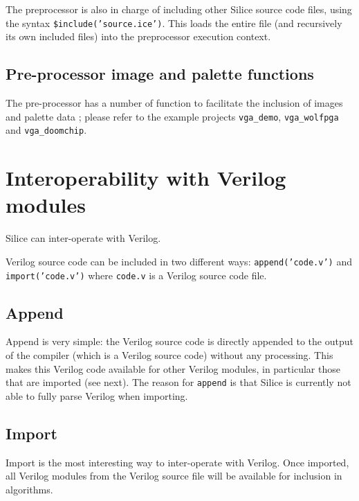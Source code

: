 \documentclass[a4]{article}
\newcommand\verilog{Verilog}
\newcommand\silice{Silice}
\begin{document}
The preprocessor is also in charge of including other Silice source code files,
using the syntax \texttt{\$include('source.ice')}. This loads the entire file
(and recursively its own included files) into the preprocessor execution context.


\subsection{Pre-processor image and palette functions}

The pre-processor has a number of function to facilitate the inclusion of images
and palette data ; please refer to the example projects \texttt{vga\_demo}, \texttt{vga\_wolfpga} and \texttt{vga\_doomchip}.


\section{Interoperability with \verilog{} modules}

\silice{} can inter-operate with \verilog{}.

\verilog{} source code can be included in two different ways: \texttt{append('code.v')} and \texttt{import('code.v')} where \texttt{code.v} is a \verilog{} source code file.

\subsection{Append}

Append is very simple: the \verilog{} source code is directly appended to the output of the compiler (which is a \verilog{} source code) without any processing. This makes this \verilog{} code available for other \verilog{} modules, in particular those that are imported (see next). The reason for \texttt{append} is that \silice{} is currently not able to fully parse \verilog{} when importing. 

\subsection{Import}

Import is the most interesting way to inter-operate with \verilog{}.
Once imported, all \verilog{} modules from the \verilog{} source file 
will be available for inclusion in algorithms.
\end{document}
